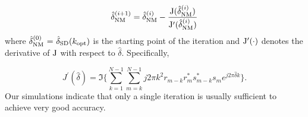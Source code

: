 \begin{equation}
    \label{eq:iter_NM_est}
    \hat{\delta}_{\text{NM}}^{(i+1)}=\hat{\delta}_{\text{NM}}^{(i)}-
    \frac{\mathrm{J}(\hat{\delta}_{\text{NM}}^{(i)})}{\mathrm{J}^\prime(\hat{\delta}_{\text{NM}}^{(i)})}
  \end{equation}
where $\hat{\delta}_{\text{NM}}^{(0)}~{=}~\hat{\delta}_{\text{SD}}(k_{\text{opt}})$ is the starting point of the iteration and
$\mathrm{J}^\prime(\cdot)$ denotes the derivative of $\mathrm{J}$ with respect to $\hat{\delta}$. Specifically,

\begin{equation}
    \label{eq:derivative of delta}
    J^\prime(\hat{\delta}) = \Im\bigg\{\sum_{k=1}^{N-1}{\sum_{m=k}^{N-1}{j2\pi k^2r_{m-k}r_m^{*}s_{m-k}^{*}s_m}e^{j2\pi\hat{\delta}k}}\bigg\}.
    \end{equation}
Our simulations indicate that only a single iteration is usually sufficient to achieve very good accuracy.


